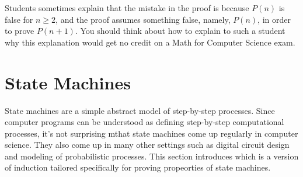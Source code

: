 
\iffalse %

The mistake in this argument is in the sentence that begins ``So $h_1$
is the same color as the remaining horses besides $h_{n+1}$ ---that is
$h_2, \dots, h_n, \dots$.''  The ``$\dots$'' notation in the
expression ``$h_1, h_2, \dots, h_n, h_{n+1}$'' creates the impression
that there are some remaining horses ---namely $h_2, \dots, h_n$
---besides $h_1$ and $h_{n+1}$.  However, this is not true when $n =
1$.  In that case, $h_1, h_2, \dots, h_n, h_{n+1}$ is just $h_1, h_2$
and \emph{there are no ``remaining'' horses} for $h_1$ to share a
color with.  And of course in this case $h_1$ and $h_2$ really don't
need to be the same color.

This mistake knocks a critical link out of our induction argument.  We
proved $P(1)$ and we \emph{correctly} proved $P(2) \implies P(3)$, $P(3)
\implies P(4)$, etc.  But we failed to prove $P(1) \implies P(2)$, and so
everything falls apart: we can not conclude that $P(2)$, $P(3)$, etc., are
true.  And, of course, these propositions are all false; there are
sets of $n$ horses of different colors for all $n \ge 2$.

\fi


Students sometimes explain that the mistake in the proof is because
$P(n)$ is false for $n \geq 2$, and the proof assumes something false,
namely, $P(n)$, in order to prove $P(n+1)$.  You should think about
how to explain to such a student why this explanation would get no
credit on a Math for Computer Science exam.

\begin{problems}
\classproblems
{}
\homeworkproblems
{}
\end{problems}

\section{State Machines}
State machines are a simple abstract model of step-by-step processes.
Since computer programs can be understood as defining step-by-step
computational processes, it's not surprising mthat state machines come
up regularly in computer science.  They also come up in many other
settings such as digital circuit design and modeling of probabilistic
processes.  This section introduces  which is a version of induction tailored specifically for
proving propeorties of state machines.

